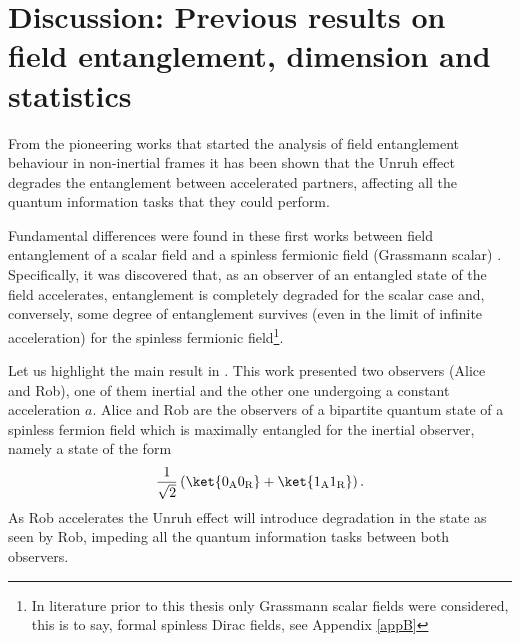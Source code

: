 

\section*{Discussion: Previous results on field entanglement, dimension and statistics}
From the pioneering works that started the analysis of field entanglement behaviour in non-inertial frames it has been shown \cite{Alicefalls,AlsingSchul} that the Unruh effect degrades the entanglement between accelerated partners, affecting all the quantum information tasks that they could perform. 

Fundamental differences were found in these first works between field entanglement of a scalar field \cite{Alicefalls} and a spinless fermionic field (Grassmann scalar) \cite{AlsingSchul}.  Specifically, it was discovered that, as an observer of an entangled state of the field accelerates, entanglement is completely degraded for the scalar case and, conversely, some degree of entanglement survives (even in the limit of infinite acceleration) for the spinless fermionic field\footnote{In literature prior to this thesis only Grassmann scalar fields were considered, this is to say, formal spinless Dirac fields, see Appendix \ref{appB}}.

Let us highlight the main result in \cite{AlsingSchul}. This work presented two observers (Alice and Rob), one of them
inertial and the other one undergoing a constant acceleration $a$. Alice and Rob are the observers of a bipartite quantum state of a spinless fermion field which is maximally entangled for the inertial observer, namely a state of the form
\begin{equation}
\frac{1}{\sqrt{2}}\left(\ket{0_\text{A}0_\text{R}}+\ket{1_\text{A}1_\text{R}}\right).
\end{equation}
As Rob accelerates the Unruh effect
will introduce degradation in the state as seen by Rob, impeding all the
quantum information tasks between both observers.


